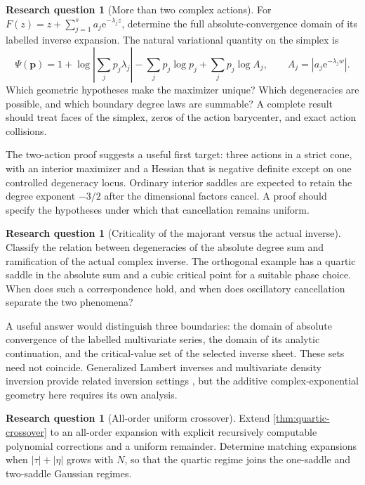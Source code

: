 \documentclass[11pt,a4paper]{article}
\numberwithin{equation}{section}
\theoremstyle{definition}
\newtheorem{question}[theorem]{Research question}
\theoremstyle{remark}
\newcommand{\e}{\mathrm e}
\begin{document}
\begin{question}[More than two complex actions]\label{q:many-actions}
For $F(z)=z+\sum_{j=1}^s a_j\e^{-\lambda_jz}$, determine the full
absolute-convergence domain of its labelled inverse expansion.
The natural variational quantity on the simplex is
\[
 \Psi(\mathbf p)
 =1+\log\left|\sum_jp_j\lambda_j\right|
    -\sum_jp_j\log p_j+\sum_jp_j\log A_j,
 \qquad A_j=|a_j\e^{-\lambda_jw}|.
\]
Which geometric hypotheses make the maximizer unique?
Which degeneracies are possible, and which boundary degree laws are
summable? A complete result should treat faces of the simplex,
zeros of the action barycenter, and exact action collisions.
\end{question}

The two-action proof suggests a useful first target: three actions
in a strict cone, with an interior maximizer and a Hessian that is
negative definite except on one controlled degeneracy locus.
Ordinary interior saddles are expected to retain the degree exponent
$-3/2$ after the dimensional factors cancel. A proof should specify
the hypotheses under which that cancellation remains uniform.

\begin{question}[Criticality of the majorant versus the actual inverse]
Classify the relation between degeneracies of the absolute degree
sum and ramification of the actual complex inverse.
The orthogonal example has a quartic saddle in the absolute sum and
a cubic critical point for a suitable phase choice.
When does such a correspondence hold, and when does oscillatory
cancellation separate the two phenomena?
\end{question}

A useful answer would distinguish three boundaries: the domain of
absolute convergence of the labelled multivariate series, the
domain of its analytic continuation, and the critical-value set
of the selected inverse sheet. These sets need not coincide.
Generalized Lambert inverses and multivariate density inversion
provide related inversion settings \cite{castle,jansen-virial,
jansen-species}, but the additive complex-exponential geometry here
requires its own analysis.

\begin{question}[All-order uniform crossover]
Extend \cref{thm:quartic-crossover} to an all-order expansion with
explicit recursively computable polynomial corrections and a
uniform remainder. Determine matching expansions when
$|\tau|+|\eta|$ grows with $N$, so that the quartic regime joins
the one-saddle and two-saddle Gaussian regimes.
\end{question}
\end{document}
